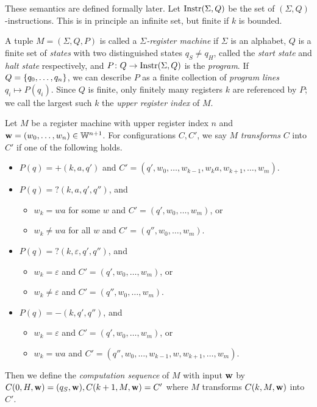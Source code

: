 These semantics are defined formally later.
Let \( \operatorname{Instr}(\Sigma, Q) \) be the set of \( (\Sigma,Q) \)-instructions.
This is in principle an infinite set, but finite if \( k \) is bounded.
\begin{definition}
	A tuple \( M = (\Sigma, Q, P) \) is called a \emph{\( \Sigma \)-register machine} if \( \Sigma \) is an alphabet, \( Q \) is a finite set of \emph{states} with two distinguished states \( q_S \neq q_H \), called the \emph{start state} and \emph{halt state} respectively, and \( P \colon Q \to \operatorname{Instr}(\Sigma,Q) \) is the \emph{program}.
	If \( Q = \qty{q_0, \dots, q_n} \), we can describe \( P \) as a finite collection of \emph{program lines} \( q_i \mapsto P(q_i) \).
	Since \( Q \) is finite, only finitely many registers \( k \) are referenced by \( P \); we call the largest such \( k \) the \emph{upper register index} of \( M \).
\end{definition}
\begin{definition}
	Let \( M \) be a register machine with upper register index \( n \) and \( \vb w = (w_0, \dots, w_n) \in \mathbb W^{n+1} \).
	For configurations \( C, C' \), we say \( M \) \emph{transforms} \( C \) into \( C' \) if one of the following holds.
	\begin{itemize}
		\item \( P(q) = +(k,a,q') \) and \( C' = (q', w_0, \dots, w_{k-1}, w_k a, w_{k+1}, \dots, w_m) \).
		\item \( P(q) = ?(k,a,q',q'') \), and
		\begin{itemize}
			\item \( w_k = wa \) for some \( w \) and \( C' = (q',w_0, \dots, w_m) \), or
			\item \( w_k \neq wa \) for all \( w \) and \( C' = (q'', w_0, \dots, w_m) \).
		\end{itemize}
		\item \( P(q) = ?(k,\varepsilon,q',q'') \), and
		\begin{itemize}
			\item \( w_k = \varepsilon \) and \( C' = (q',w_0, \dots, w_m) \), or
			\item \( w_k \neq \varepsilon \) and \( C' = (q'', w_0, \dots, w_m) \).
		\end{itemize}
		\item \( P(q) = -(k,q',q'') \), and
		\begin{itemize}
			\item \( w_k = \varepsilon \) and \( C' = (q',w_0, \dots, w_m) \), or
			\item \( w_k = wa \) and \( C' = (q'', w_0, \dots, w_{k-1}, w, w_{k+1}, \dots, w_m) \).
		\end{itemize}
	\end{itemize}
	Then we define the \emph{computation sequence} of \( M \) with input \( \vb w \) by \( C(0,H,\vb w) = (q_S,\vb w), C(k+1,M,\vb w) = C' \) where \( M \) transforms \( C(k,M,\vb w) \) into \( C' \).
\end{definition}
